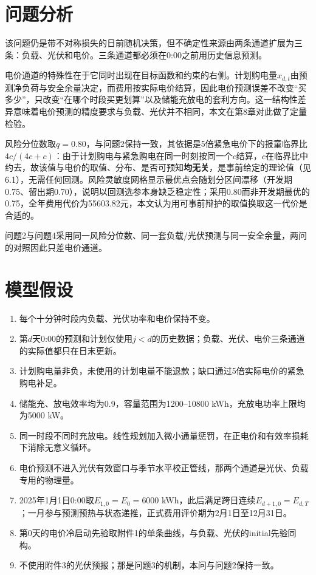 \documentclass[UTF8,12pt]{ctexart}
\begin{document}
\section{问题分析}
该问题仍是带不对称损失的日前随机决策，但不确定性来源由两条通道扩展为三条：负载、光伏和电价。三条通道都必须在0:00之前用历史信息预测。

电价通道的特殊性在于它同时出现在目标函数和约束的右侧。计划购电量$x_{d,t}$由预测净负荷与安全余量决定，而费用按实际电价结算，因此电价预测误差不改变“买多少”，只改变“在哪个时段买更划算”以及储能充放电的套利方向。这一结构性差异意味着电价预测的精度要求与负载、光伏并不相同，本文在第8章对此做了定量检验。

风险分位数取$q=0.80$，与问题2保持一致，其依据是5倍紧急电价下的报童临界比$4c/(4c+c)$：由于计划购电与紧急购电在同一时刻按同一个$c$结算，$c$在临界比中约去，故该值与电价的取值、分布、是否可预知\textbf{均无关}，是事前给定的理论值（见6.1），无需任何回测。风险灵敏度网格显示最优点会随划分区间漂移（开发期0.75、留出期0.70），说明以回测选参本身缺乏稳定性；采用0.80而非开发期最优的0.75，全年费用代价为55603.82元，本文认为用可事前辩护的取值换取这一代价是合适的。

问题2与问题4采用同一风险分位数、同一套负载/光伏预测与同一安全余量，两问的对照因此只差电价通道。

\section{模型假设}
\begin{enumerate}
\item 每个十分钟时段内负载、光伏功率和电价保持不变。
\item 第$d$天0:00的预测和计划仅使用$j<d$的历史数据；负载、光伏、电价三条通道的实际值都只在日末更新。
\item 计划购电量非负，未使用的计划电量不能退款；缺口通过5倍实际电价的紧急购电补足。
\item 储能充、放电效率均为0.9，容量范围为1200--10800 kWh，充放电功率上限均为5000 kW。
\item 同一时段不同时充放电。线性规划加入微小通量惩罚，在正电价和有效率损耗下消除无意义循环。
\item 电价预测不进入光伏有效窗口与季节水平校正管线，那两个通道是光伏、负载专用的物理量。
\item 2025年1月1日0:00取$E_{1,0}=E_0=6000$ kWh，此后满足跨日连续$E_{d+1,0}=E_{d,T}$；一月参与预测预热与状态递推，正式费用评价期为2月1日至12月31日。
\item 第0天的电价冷启动先验取附件1的单条曲线，与负载、光伏的initial先验同构。
\item 不使用附件3的光伏预报；那是问题3的机制，本问与问题2保持一致。
\end{enumerate}
\end{document}
